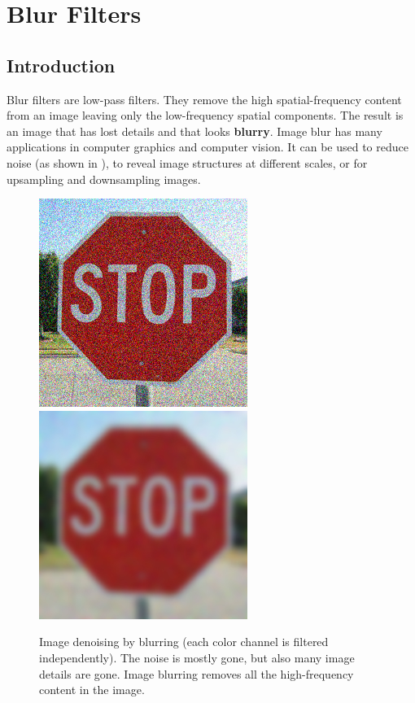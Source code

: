 
\chapter{Blur Filters}
\label{chap:blur_filters}




\section{Introduction}

Blur filters are low-pass filters. They remove the high spatial-frequency content from an image leaving only the low-frequency spatial components. The result is an image that has lost details and that looks {\bf blurry}. Image blur has many applications in computer graphics and computer vision. It can be used to reduce noise (as shown in \fig{\ref{fig:stop_256_noise_3}}), to reveal image structures at different scales, or for upsampling and downsampling images.


\begin{figure}[h]
\centerline{
\includegraphics[width=.475\linewidth]{figures/blur_filters/stop_256_noise_3.jpg}~
\includegraphics[width=.475\linewidth]{figures/blur_filters/stop_256_blur_3.jpg}
}
\caption{Image denoising by blurring (each color channel is filtered independently). The noise is mostly gone, but also many image details are gone. Image blurring removes all the high-frequency content in the image.}
\label{fig:stop_256_noise_3}
\end{figure}


